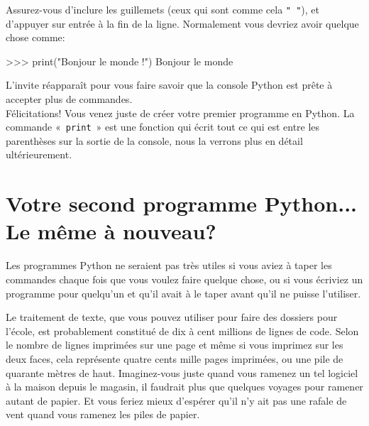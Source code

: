 Assurez-vous d'inclure les guillemets (ceux qui sont comme cela \texttt{" "}), et d'appuyer sur entrée à la fin de la ligne.
Normalement vous devriez avoir quelque chose comme:

\begin{Verbatim*}[frame=single,rulecolor=\color{mbleu}, label=à taper si cela n'est pas déjà fait]
>>> print("Bonjour le monde !")
Bonjour le monde
\end{Verbatim*}


L'invite réapparaît pour vous faire savoir que la console Python est prête à accepter plus de commandes.
\\


Félicitations! Vous venez juste de créer votre premier programme en Python. La commande «~\verb+print+~» est une fonction qui écrit tout ce qui est entre les parenthèses sur la sortie de la console, nous la verrons plus en détail ultérieurement.

\section{Votre second programme Python... Le même à nouveau?}

Les programmes Python ne seraient pas très utiles si vous aviez à taper les commandes chaque fois que vous voulez faire quelque chose, ou si vous écriviez un programme pour quel\-qu'un et qu'il avait à le taper avant qu'il ne puisse l'utiliser.

Le traitement de texte, que vous pouvez utiliser pour faire des dossiers pour l'école, est probablement constitué de dix à cent millions de lignes de code. Selon le nombre de lignes imprimées sur une page et même si vous imprimez sur les deux faces, cela représente quatre cents mille pages imprimées, ou une pile de quarante mètres de haut. Imaginez-vous juste quand vous ramenez un tel logiciel à la maison depuis le magasin, il faudrait plus que quelques voyages pour ramener autant de papier. Et vous feriez mieux d'espérer qu'il n'y ait pas une rafale de vent quand vous ramenez les piles de papier.


